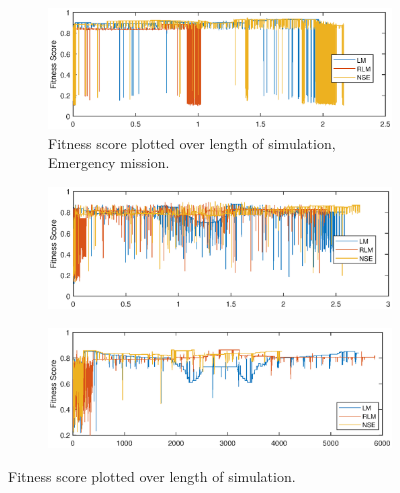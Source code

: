 \begin{figure}[ht]
\begin{center}
\begin{subfigure}{\linewidth}
\centering
\includegraphics[width=\linewidth]{figures/matlab_sim_results/fitObserved_emer.eps}
\caption{Fitness score plotted over length of simulation, Emergency mission.}\label{res:matSimFitscore}
\end{subfigure}
\end{center}

\begin{center}
\begin{subfigure}{\linewidth}		
\centering
\includegraphics[width=\linewidth]{figures/matlab_sim_results/fitObserved_coop.eps}
\end{subfigure}
\end{center}

\begin{center}
\begin{subfigure}{\linewidth}
	\centering
	\includegraphics[width=\linewidth]{figures/matlab_sim_results/fitObserved_powerSave.eps}
\end{subfigure}
\end{center}
\caption{Fitness score plotted over length of simulation.}\label{res:matSimFitscore}
\end{figure}
\clearpage

